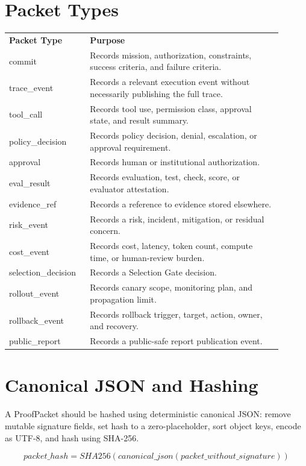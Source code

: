\documentclass[11pt]{article}
\begin{document}
\section{Packet Types}
\begin{longtable}{p{0.25\linewidth}p{0.65\linewidth}}
\textbf{Packet Type} & \textbf{Purpose}\\
commit & Records mission, authorization, constraints, success criteria, and failure criteria.\\
trace\_event & Records a relevant execution event without necessarily publishing the full trace.\\
tool\_call & Records tool use, permission class, approval state, and result summary.\\
policy\_decision & Records policy decision, denial, escalation, or approval requirement.\\
approval & Records human or institutional authorization.\\
eval\_result & Records evaluation, test, check, score, or evaluator attestation.\\
evidence\_ref & Records a reference to evidence stored elsewhere.\\
risk\_event & Records a risk, incident, mitigation, or residual concern.\\
cost\_event & Records cost, latency, token count, compute time, or human-review burden.\\
selection\_decision & Records a Selection Gate decision.\\
rollout\_event & Records canary scope, monitoring plan, and propagation limit.\\
rollback\_event & Records rollback trigger, target, action, owner, and recovery.\\
public\_report & Records a public-safe report publication event.\\
\end{longtable}

\section{Canonical JSON and Hashing}
A ProofPacket should be hashed using deterministic canonical JSON: remove mutable signature fields, set hash to a zero-placeholder, sort object keys, encode as UTF-8, and hash using SHA-256.

\[
packet\_hash = SHA256(canonical\_json(packet\_without\_signature))
\]
\end{document}
